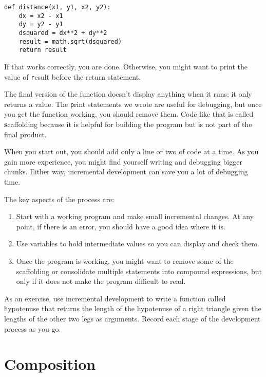 \documentclass[
DIV=11,
fontsize=13,
twoside,
headinclude=false,
titlepage=firstiscover,
abstract=true,
headsepline=true,
footsepline=true,
chapterprefix=true, %
headings=big,
bibliography=totoc,%
captions=tableheading
]{scrbook}
\theoremstyle{definition}
\begin{document}
\begin{lstlisting}
def distance(x1, y1, x2, y2):
    dx = x2 - x1
    dy = y2 - y1
    dsquared = dx**2 + dy**2
    result = math.sqrt(dsquared)
    return result
\end{lstlisting}
%
If that works correctly, you are done.  Otherwise, you might
want to print the value of {\texttt result} before the return
statement.

The final version of the function doesn't display anything when it
runs; it only returns a value.  The {\texttt print} statements we wrote
are useful for debugging, but once you get the function working, you
should remove them.  Code like that is called {\textbf scaffolding}
because it is helpful for building the program but is not part of the
final product.

When you start out, you should add only a line or two of code at a
time.  As you gain more experience, you might find yourself writing
and debugging bigger chunks.  Either way, incremental development
can save you a lot of debugging time.

The key aspects of the process are:

\begin{enumerate}

\item Start with a working program and make small incremental changes. 
At any point, if there is an error, you should have a good idea
where it is.

\item Use variables to hold intermediate values so you can
display and check them.

\item Once the program is working, you might want to remove some of
the scaffolding or consolidate multiple statements into compound
expressions, but only if it does not make the program difficult to
read.

\end{enumerate}

As an exercise, use incremental development to write a function
called {\texttt hypotenuse} that returns the length of the hypotenuse of a
right triangle given the lengths of the other two legs as arguments.
Record each stage of the development process as you go.



\section{Composition}
\end{document}
